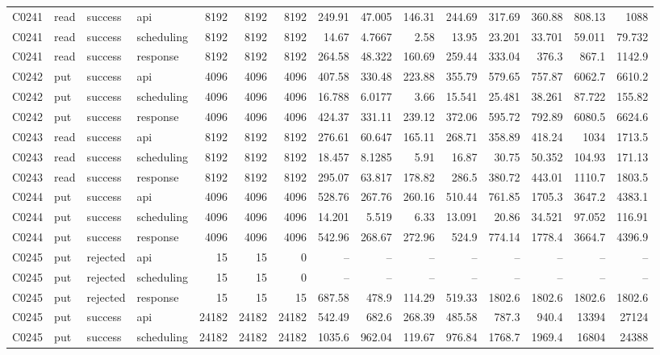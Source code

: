 \begin{landscape}
\begin{longtable}{llllrrrrrrrrrrr}
C0241 & read & success & api & 8192 & 8192 & 8192 & 249.91 & 47.005 & 146.31 & 244.69 & 317.69 & 360.88 & 808.13 & 1088\\
C0241 & read & success & scheduling & 8192 & 8192 & 8192 & 14.67 & 4.7667 & 2.58 & 13.95 & 23.201 & 33.701 & 59.011 & 79.732\\
C0241 & read & success & response & 8192 & 8192 & 8192 & 264.58 & 48.322 & 160.69 & 259.44 & 333.04 & 376.3 & 867.1 & 1142.9\\
C0242 & put & success & api & 4096 & 4096 & 4096 & 407.58 & 330.48 & 223.88 & 355.79 & 579.65 & 757.87 & 6062.7 & 6610.2\\
C0242 & put & success & scheduling & 4096 & 4096 & 4096 & 16.788 & 6.0177 & 3.66 & 15.541 & 25.481 & 38.261 & 87.722 & 155.82\\
C0242 & put & success & response & 4096 & 4096 & 4096 & 424.37 & 331.11 & 239.12 & 372.06 & 595.72 & 792.89 & 6080.5 & 6624.6\\
C0243 & read & success & api & 8192 & 8192 & 8192 & 276.61 & 60.647 & 165.11 & 268.71 & 358.89 & 418.24 & 1034 & 1713.5\\
C0243 & read & success & scheduling & 8192 & 8192 & 8192 & 18.457 & 8.1285 & 5.91 & 16.87 & 30.75 & 50.352 & 104.93 & 171.13\\
C0243 & read & success & response & 8192 & 8192 & 8192 & 295.07 & 63.817 & 178.82 & 286.5 & 380.72 & 443.01 & 1110.7 & 1803.5\\
C0244 & put & success & api & 4096 & 4096 & 4096 & 528.76 & 267.76 & 260.16 & 510.44 & 761.85 & 1705.3 & 3647.2 & 4383.1\\
C0244 & put & success & scheduling & 4096 & 4096 & 4096 & 14.201 & 5.519 & 6.33 & 13.091 & 20.86 & 34.521 & 97.052 & 116.91\\
C0244 & put & success & response & 4096 & 4096 & 4096 & 542.96 & 268.67 & 272.96 & 524.9 & 774.14 & 1778.4 & 3664.7 & 4396.9\\
C0245 & put & rejected & api & 15 & 15 & 0 & -- & -- & -- & -- & -- & -- & -- & --\\
C0245 & put & rejected & scheduling & 15 & 15 & 0 & -- & -- & -- & -- & -- & -- & -- & --\\
C0245 & put & rejected & response & 15 & 15 & 15 & 687.58 & 478.9 & 114.29 & 519.33 & 1802.6 & 1802.6 & 1802.6 & 1802.6\\
C0245 & put & success & api & 24182 & 24182 & 24182 & 542.49 & 682.6 & 268.39 & 485.58 & 787.3 & 940.4 & 13394 & 27124\\
C0245 & put & success & scheduling & 24182 & 24182 & 24182 & 1035.6 & 962.04 & 119.67 & 976.84 & 1768.7 & 1969.4 & 16804 & 24388\\

\end{longtable}
\end{landscape}
